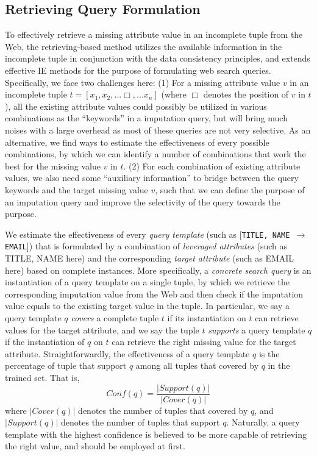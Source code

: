 \documentclass[sigconf]{acmart}
\begin{document}
\subsection{Retrieving Query Formulation}
To effectively retrieve a missing attribute value in an incomplete tuple from the Web, the retrieving-based method utilizes the available information in the incomplete tuple in conjunction with the data consistency principles, and extends effective IE methods for the purpose of formulating web search queries. Specifically, we face two challenges here: (1) For a missing attribute value $v$ in an incomplete tuple $t=[x_1,x_2 , ... \Box, ... x_n]$ (where $\Box$ denotes the position of $v$ in $t$), all the existing attribute values could possibly be utilized in various combinations as the ``keywords'' in a imputation query, but will bring much noises with a large overhead as most of these queries are not very selective. As an alternative, we find ways to estimate the effectiveness of every possible combinations, by which we can identify a number of combinations that work the best for the missing value $v$ in $t$.
%
(2) For each combination of existing attribute values, we also need some ``auxiliary information'' to bridge between the query keywords and the target missing value $v$, such that we can define the purpose of an imputation query and improve the selectivity of the query towards the purpose.

We estimate the effectiveness of every {\em query template} (such as  [{\tt TITLE, NAME $\to$ EMAIL}]) that is formulated by a combination of {\em leveraged attributes} (such as TITLE, NAME here) and the corresponding {\em target attribute} (such as EMAIL here) based on complete instances.
%
More specifically, a {\em concrete search query} is an instantiation of a query template on a single tuple, by which we retrieve the  corresponding imputation value from the Web and then check if the imputation value equals to the existing target value in the tuple.
%
In particular, we say a query template $q$ {\em covers} a complete tuple $t$ if its instantiation on $t$ can retrieve values for the target attribute, and we say the tuple $t$ {\em supports} a query template $q$ if the instantiation of $q$ on $t$ can retrieve the right missing value for the target attribute. Straightforwardly, the effectiveness of a query template $q$ is the percentage of tuple that support $q$ among all tuples that covered by $q$ in the trained set. That is,
\begin{equation}
Conf(q)=\frac{|Support(q)|}{|Cover(q)|}
\end{equation}
where $|Cover(q)|$ denotes the number of tuples that covered by $q$, and $|Support(q)|$ denotes the number of tuples that support $q$. Naturally, a query template with the highest confidence is believed to be more capable of retrieving the right value, and should be employed at first.
\end{document}
